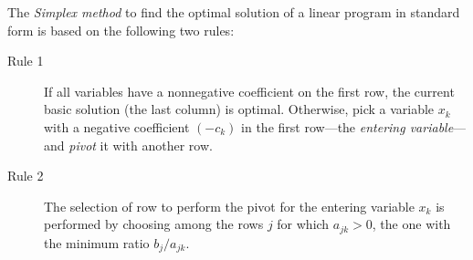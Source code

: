 \separator

The \emph{Simplex method} to find the optimal solution of a linear program in standard form is based on the following two rules:
\begin{description}
	\item[Rule 1] If all variables have a nonnegative coefficient on the first row, the current basic solution (the last column) is optimal.  Otherwise, pick a variable $x_k$ with a negative coefficient $(-c_k)$ in the first row---the \emph{entering variable}---and \emph{pivot} it with another row.

	\item[Rule 2] The selection of row to perform the pivot for the entering variable $x_k$ is performed by choosing among the rows $j$ for which $a_{jk} > 0$, the one with the minimum ratio $b_j/a_{jk}$.
\end{description}

